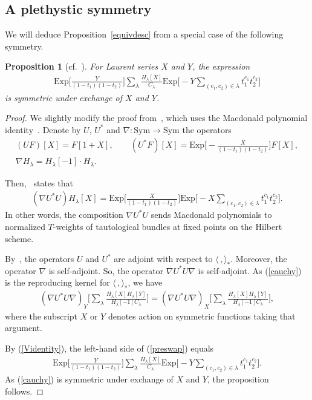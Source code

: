 \documentclass[10pt,a4paper]{amsart}
\newtheorem{Proposition}[Theorem]{Proposition}
 { \theoremstyle{definition}
\newtheorem{Definition}[Theorem]{Definition}
\newtheorem{Note}[Theorem]{Note}
\newtheorem{Example}[Theorem]{Example}
\newtheorem{Remark}[Theorem]{Remark} }
\numberwithin{equation}{section}
\newcommand{\Sym}{\mathrm{Sym}}
\newcommand{\Exp}{\mathrm{Exp}}
\begin{document}
\subsection{A plethystic symmetry}
We will deduce Proposition~\ref{equivdesc} from a special case of the following symmetry.

\begin{Proposition}[{cf.~\cite[Section~7]{M}}]\label{Macsym}
For Laurent series $X$ and $Y$, the expression
\begin{align}\label{Macid}
\Exp\bigg[\frac{Y}{(1-t_1)(1-t_2)}\bigg]\sum_{\lambda}\frac{H_{\lambda}[X]}{C_{\lambda}} \Exp\biggl[{-}Y \sum_{(c_1,c_2)\in \lambda} t_1^{c_1}t_2^{c_2}\biggr]
\end{align}
is symmetric under exchange of $X$ and $Y$.
\end{Proposition}

\begin{proof} We slightly modify the proof from~\cite{M}, which uses the Macdonald polynomial identity~\cite[Theorem~I.3]{GHT}.
Denote by $U$, $U^*$ and $\nabla\colon \Sym\to \Sym$ the operators
\begin{gather*}
(UF)[X]=F[1+X], \qquad
(U^*F)[X]=\Exp \biggl[{-}\frac{X}{(1 - t_1)(1 - t_2)}\biggr] F[X], \\
\nabla H_{\lambda} =H_{\lambda}[-1]\cdot H_{\lambda}.
\end{gather*}

Then,~\cite[Theorem~I.3]{GHT} states that
\begin{align}\label{Videntity}
(\nabla U^*U)H_{\lambda}[X]=\Exp\bigg[\frac{X}{(1-t_1)(1-t_2)}\bigg] \Exp\biggl[{-}X \sum_{(c_1,c_2)\in \lambda} t_1^{c_1}t_2^{c_2}\biggr].
\end{align}
In other words, the composition $\nabla U^*U$ sends Macdonald polynomials to normalized $T$-weights of tautological bundles at fixed points on the Hilbert scheme.


By~\cite[Proposition 1.11b]{GHT}, the operators $U$ and $U^*$ are adjoint with respect to $\langle\,,\rangle_{*}$. Moreover, the operator $\nabla$ is self-adjoint. So, the operator $\nabla U^*U\nabla$ is self-adjoint. As (\ref{cauchy}) is the reproducing kernel for $\langle\,,\rangle_*$, we have
\begin{align}\label{preswap}
(\nabla U^* U\nabla)_{Y}\bigg[\sum_{\lambda} {\frac{H_{\lambda}[X] H_{\lambda}[Y]} {H_{\lambda}[-1]C_{\lambda}} }\bigg]=(\nabla U^*U\nabla)_{X}\bigg[\sum_{\lambda} {\frac{H_{\lambda}[X] H_{\lambda}[Y]} {H_{\lambda}[-1]C_{\lambda}} }\bigg],
\end{align}
where the subscript $X$ or $Y$ denotes action on symmetric functions taking that argument.

By (\ref{Videntity}), the left-hand side of (\ref{preswap}) equals
\begin{align*}%
\Exp\bigg[\frac{Y}{(1-t_1)(1-t_2)}\bigg]\sum_{\lambda}\frac{H_{\lambda}[X]}{C_{\lambda}}\Exp\bigg[{-}Y \sum_{(c_1,c_2)\in \lambda} t_1^{c_1}t_2^{c_2}\bigg].
\end{align*}
As (\ref{cauchy}) is symmetric under exchange of $X$ and $Y$, the proposition follows.
\end{proof}
\end{document}
